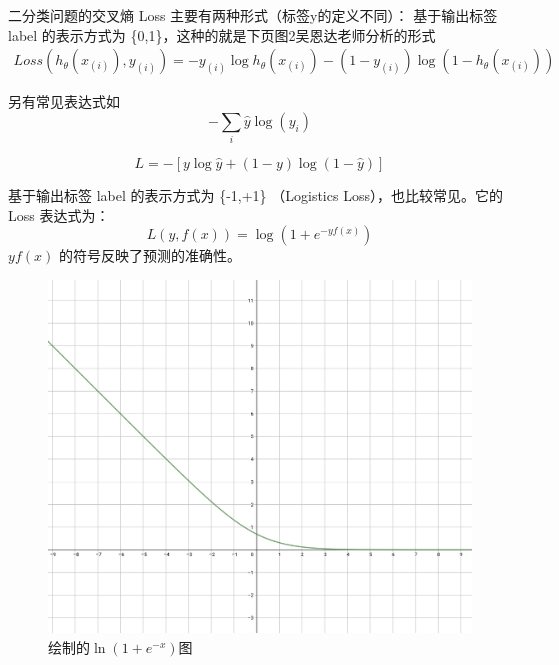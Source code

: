 \begin{outline}
 \noindent 二分类问题的交叉熵 Loss 主要有两种形式（标签y的定义不同）：
 \2 基于输出标签 label 的表示方式为 \{0,1\}，这种的就是下页图2吴恩达老师分析的形式
 \begin{equation}\label{loss:9}
	\begin{aligned}
		Loss(h_{\theta}(x_{(i)}),y_{(i)})=-y_{(i)}\log h_{\theta}(x_{(i)})-(1-y_{(i)})\log(1-h_{\theta}(x_{(i)}))
	\end{aligned}
	\end{equation}

	另有常见表达式如
	\begin{equation}\label{loss:10}
	-\sum_{i} \hat{y} \log \left(y_{i}\right)
	\end{equation}

	\begin{equation}\label{loss:11}
	L=-[y \log \hat{y}+(1-y) \log (1-\hat{y})]
	\end{equation}

	\2 基于输出标签 label 的表示方式为 \{-1,+1\} （Logistics Loss），也比较常见。它的 Loss 表达式为：
   \begin{equation}\label{loss:12}
	L(y, f(x))=\log \left(1+e^{-y f(x)}\right)
   \end{equation}
	$yf(x)$ 的符号反映了预测的准确性。


		\begin{figure}[h!]%
    \centering
    \includegraphics[scale=0.12]{figs/3.jpg} 
    \caption{绘制的$\ln \left(1+e^{-x}\right)$图}
	\label{fig:cross2}
 \end{figure}


\end{outline}

